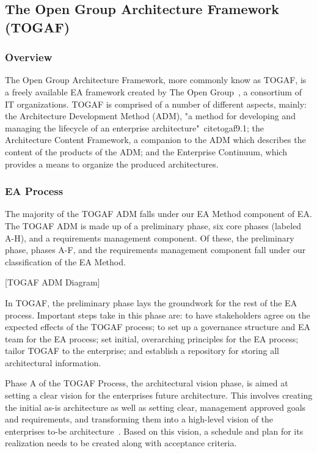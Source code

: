 \subsection{The Open Group Architecture Framework (TOGAF)}

\subsubsection{Overview}
The Open Group Architecture Framework, more commonly know as TOGAF, is a freely available EA framework created by The Open Group~\cite{togaf9.1}, a consortium of IT organizations. TOGAF is comprised of a number of different aspects, mainly: the Architecture Development Method (ADM), "a method for developing and managing the lifecycle of an enterprise architecture"~cite{togaf9.1}; the Architecture Content Framework, a companion to the ADM which describes the content of the products of the ADM; and the Enterprise Continuum, which provides a means to organize the produced architectures. 

%
%

\subsubsection{EA Process}
The majority of the TOGAF ADM falls under our EA Method component of EA. The TOGAF ADM is made up of a preliminary phase, six core phases (labeled A-H), and a requirements management component. Of these, the preliminary phase, phases A-F, and the requirements management component fall under our classification of the EA Method. 

[TOGAF ADM Diagram]

In TOGAF, the preliminary phase lays the groundwork for the rest of the EA process. Important steps take in this phase are: to have stakeholders agree on the expected effects of the TOGAF process; to set up a governance structure and EA team for the EA process; set initial, overarching principles for the EA process; tailor TOGAF to the enterprise; and establish a repository for storing all architectural information.~\cite{togaf9.1}

Phase A of the TOGAF Process, the architectural vision phase, is aimed at setting a clear vision for the enterprises future architecture. This involves creating the initial as-is architecture as well as setting clear, management approved goals and requirements, and transforming them into a high-level vision of the enterprises to-be architecture~\cite{togaf9.1}. Based on this vision, a schedule and plan for its realization needs to be created along with acceptance criteria. 

